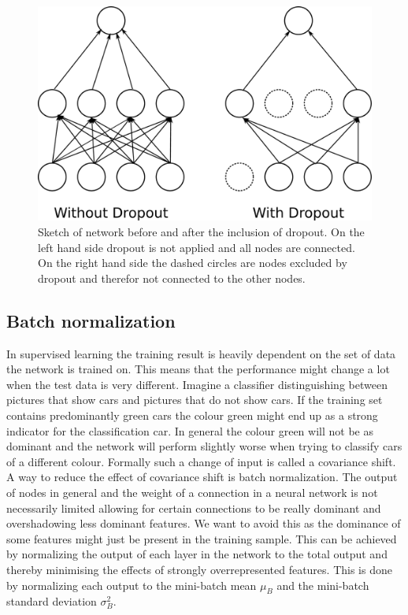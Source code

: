 \begin{figure}[htbp]
	\centering
	\includegraphics[scale = 0.1]{figures_ML/dropout.eps}
	\caption[Dropout Sketch]{Sketch of network before and after the inclusion of dropout. On the left hand side dropout is not applied and all nodes are connected. On the right hand side the dashed circles are nodes excluded by dropout and therefor not connected to the other nodes.}
	\label{fig:dropout}
\end{figure}



\subsection{Batch normalization}
\label{sec:batch_norm}

In supervised learning the training result is heavily dependent on the set of data the network is trained on. This means that the performance might change a lot when the test data is very different. Imagine a classifier distinguishing between pictures that show cars and pictures that do not show cars. If the training set contains predominantly green cars the colour green might end up as a strong indicator for  the classification car. In general the colour green will not be as dominant and the network will perform slightly worse when trying to classify cars of a different colour. Formally such a change of input is called a covariance shift.\\
A way to reduce the effect of covariance shift is batch normalization. The output of nodes in general and the weight of a connection in a neural network is not necessarily limited allowing for certain connections to be really dominant and overshadowing less dominant features. We want to avoid this as the dominance of some features might just be present in the training sample. This can be achieved by normalizing the output of each layer in the network to the total output and thereby minimising the effects of strongly overrepresented features. This is done by normalizing each output to the mini-batch mean $\mu_B$ and the mini-batch standard deviation $\sigma_B^2$.


